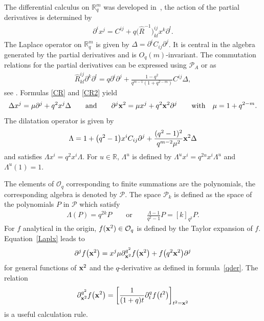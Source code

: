 \documentclass[pdftex]{sigma}
\newcommand{\mR}{\mathbb{R}}
\newcommand{\cP}{\mathcal{P}}
\newcommand{\cO}{\mathcal{O}}
\numberwithin{equation}{section}
\begin{document}
The dif\/ferential calculus on $\mR^m_q$ was developed in~\cite{MR1138053, MR1182031}, the action of the partial derivatives is determined by
\begin{gather}
\label{defpart}
\partial^ix^j = C^{ij}+q\big(\hat{R}^{-1}\big)^{ij}_{kl}x^k\partial^l .
\end{gather}
The Laplace operator on $\mR^m_q$ is given by $\Delta=\partial^iC_{ij} \partial^j$. It is central in the algebra generated by the partial derivatives and is $O_q(m)$-invariant. The commutation relations for the partial derivatives can be expressed using $\cP_A$ or as
\begin{gather}
\label{Rxx}
\hat{R}^{ij}_{kl}\partial^k\partial^l = q\partial^i\partial^j+\frac{1-q^2}{q^{m-1}(1+q^{2-m})} C^{ij}\Delta,
\end{gather}
see \cite{MR1182031}. Formulas \eqref{CR} and \eqref{CR2} yield
\begin{gather}
\label{Laplx}
\Delta x^j=\mu\partial^j+q^2x^j\Delta \qquad \mbox{and} \qquad \partial^j\bold{x}^2=\mu x^j+q^2\bold{x}^2\partial^j\qquad  \mbox{with} \quad\mu=1+q^{2-m}.
\end{gather}
The dilatation operator is given by
\begin{gather}
\label{dil}
\Lambda=1+\big(q^2-1\big)x^iC_{ij}\partial^j+\frac{(q^2-1)^2}{q^{m-2}\mu^2}\bold{x}^2\Delta
\end{gather}
and satisf\/ies $\Lambda x^i=q^2x^i\Lambda $. For $u\in\mR$, $\Lambda^u$ is def\/ined by $\Lambda^u x^i=q^{2u}x^i\Lambda^u$ and $\Lambda^u(1)=1$.

The elements of $\cO_q$ corresponding to f\/inite summations are the polynomials, the correspon\-ding algebra is denoted by $\cP$. The space $\cP_k$ is def\/ined as the space of the polynomials $P$ in $\cP$ which satisfy
\begin{gather}
\label{propdil}
\Lambda (P)=q^{2k}P \qquad \mbox{or} \qquad \frac{\Lambda-1}{q^2-1}P=[k]_{q^2}P.
\end{gather}
For $f$ analytical in the origin, $f(\bold{x}^2)\in\cO_q$ is def\/ined by the Taylor expansion of $f$. Equa\-tion~\eqref{Laplx} leads to
\begin{gather}
\label{partialr}
\partial^jf\big(\bold{x}^2\big) = x^j\mu\partial_{\bold{x}^2}^{q^2}f\big(\bold{x}^2\big)+f\big(q^2\bold{x}^2\big)\partial^j
\end{gather}
for general functions of $\bold{x}^2$ and the $q$-derivative as def\/ined in formula~\eqref{qder}. The relation{\samepage
\begin{gather}
\label{berpx2}
\partial_{\bold{x}^2}^{q^2}f\big(\bold{x}^2\big) = \left[\frac{1}{(1+q)t}\partial_t^qf\big(t^2\big)\right]_{t^2=\bold{x}^2}
\end{gather}
is a useful calculation rule.}
\end{document}
